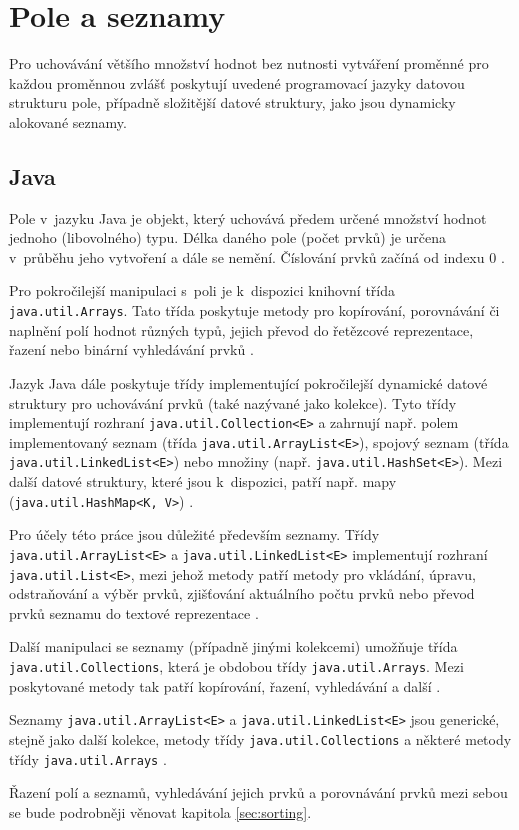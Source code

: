\documentclass[czech,BP]{thesiskiv}
\begin{document}
\section{Pole a seznamy}
Pro uchovávání většího množství hodnot bez nutnosti vytváření proměnné pro každou proměnnou zvlášť poskytují uvedené programovací jazyky datovou strukturu pole, případně složitější datové struktury, jako jsou dynamicky alokované seznamy.

\subsection{Java}
Pole v~jazyku Java je objekt, který uchovává předem určené množství hodnot jednoho (libovolného) typu. Délka daného pole (počet prvků) je určena v~průběhu jeho vytvoření a dále se nemění. Číslování prvků začíná od indexu 0 \cite{java-guide-array}.\par
Pro pokročilejší manipulaci s~poli je k~dispozici knihovní třída \texttt{java.util\-.Arrays}. Tato třída poskytuje metody pro kopírování, porovnávání či naplnění polí hodnot různých typů, jejich převod do řetězcové reprezentace, řazení nebo binární vyhledávání prvků \cite{java-guide-arrays}.\par
Jazyk Java dále poskytuje třídy implementující pokročilejší dynamické datové struktury pro uchovávání prvků (také nazývané jako kolekce). Tyto třídy implementují rozhraní \texttt{java.util.Collection<E>} a zahrnují např. polem implementovaný seznam (třída \texttt{java.util.ArrayList<E>}), spojový seznam (třída \texttt{java.util.LinkedList<E>}) nebo množiny (např. \texttt{java.util\-.HashSet<E>}). Mezi další datové struktury, které jsou k~dispozici, patří např. mapy (\texttt{java.util.HashMap<K, V>}) \cite{java-guide-collection, java-guide-arraylist, java-guide-linkedlist, java-guide-hashset, java-guide-hashmap}.\par
Pro účely této práce jsou důležité především seznamy. Třídy \texttt{java.util\-.ArrayList<E>} a \texttt{java.util.LinkedList<E>} implementují rozhraní \texttt{java\-.util.List<E>}, mezi jehož metody patří metody pro vkládání, úpravu, odstraňování a výběr prvků, zjišťování aktuálního počtu prvků nebo převod prvků seznamu do textové reprezentace \cite{java-guide-list, java-guide-arraylist, java-guide-linkedlist}.\par
Další manipulaci se seznamy (případně jinými kolekcemi) umožňuje třída \texttt{java.util.Collections}, která je obdobou třídy \texttt{java.util.Arrays}. Mezi poskytované metody tak patří kopírování, řazení, vyhledávání a další \cite{java-guide-collections}.\par
Seznamy \texttt{java.util.ArrayList<E>} a \texttt{java.util.LinkedList<E>} jsou generické, stejně jako další kolekce, metody třídy \texttt{java.util.Collections} a některé metody třídy \texttt{java.util.Arrays} \cite{java-guide-arraylist, java-guide-linkedlist, java-guide-arrays, java-guide-collections}.\par
Řazení polí a seznamů, vyhledávání jejich prvků a porovnávání prvků mezi sebou se bude podrobněji věnovat kapitola \ref{sec:sorting}.
\end{document}
